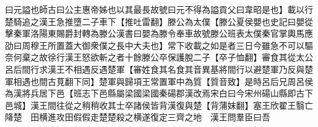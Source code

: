 曰元謚也師古曰公主惠帝姊也以其最長故號曰元不得為謚貢父曰韋昭是也】載以行楚騎追之漢王急推墮二子車下【推吐雷翻】滕公為太僕【滕公夏侯嬰也史記曰嬰從擊秦軍洛陽東賜爵封轉為滕公漢書曰嬰為滕令奉車故號滕公班表太僕秦官掌輿馬應劭曰周穆王所置蓋大御衆僕之長中大夫也】常下收載之如是者三日今雖急不可以驅奈何棄之故徐行漢王怒欲斬之者十餘滕公卒保護脫二子【卒子恤翻】審食其從太公呂后間行求漢王不相遇反遇楚軍【審姓食其名食其音異基將間行以避楚軍乃反與楚軍相遇也間古莧翻下同】楚軍與歸項王常置軍中為質【質音致】是時呂后兄周呂侯為漢將兵居下邑【班志下邑縣屬梁國梁國秦碭郡漢改焉宋白曰今宋州碭山縣即古下邑城】漢王間往從之稍稍收其士卒諸侯皆背漢復與楚【背蒲妺翻】塞王欣翟王翳亡降楚　田横進攻田假假走楚楚殺之横遂復定三齊之地　漢王問羣臣曰吾
